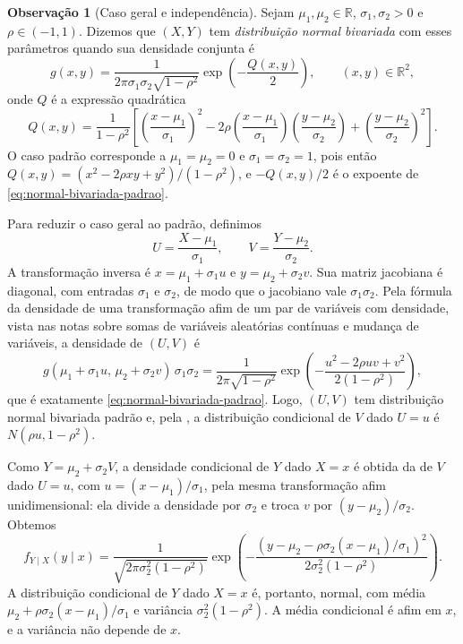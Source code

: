 \documentclass[12pt,portuguese]{article}
\theoremstyle{definition}
\newtheorem{remark}[remark]{Observação}
\theoremstyle{plainexercise}
\theoremstyle{starredexercise}
\theoremstyle{definition}
\begin{document}
\begin{remark}[Caso geral e independência]\label{rem:normal-independencia}
Sejam $\mu_1,\mu_2 \in \mathbb{R}$, $\sigma_1,\sigma_2 > 0$ e $\rho \in (-1,1)$. Dizemos que
$(X,Y)$ tem \emph{distribuição normal bivariada} com esses parâmetros quando sua densidade
conjunta é
\begin{equation}
  g(x,y) = \frac{1}{2\pi\sigma_1\sigma_2\sqrt{1-\rho^2}}
  \exp\!\left(-\frac{Q(x,y)}{2}\right),
  \qquad (x,y) \in \mathbb{R}^2,
  \label{eq:normal-bivariada-geral}
\end{equation}
onde $Q$ é a expressão quadrática
\begin{equation}
  Q(x,y) = \frac{1}{1-\rho^2}\left[
    \left(\frac{x-\mu_1}{\sigma_1}\right)^2
    - 2\rho\left(\frac{x-\mu_1}{\sigma_1}\right)
         \left(\frac{y-\mu_2}{\sigma_2}\right)
    + \left(\frac{y-\mu_2}{\sigma_2}\right)^2
  \right].
  \label{eq:forma-quadratica-normal}
\end{equation}
O caso padrão corresponde a $\mu_1 = \mu_2 = 0$ e $\sigma_1 = \sigma_2 = 1$, pois então
$Q(x,y) = (x^2 - 2\rho xy + y^2)/(1-\rho^2)$, e $-Q(x,y)/2$ é o expoente de
\eqref{eq:normal-bivariada-padrao}.

Para reduzir o caso geral ao padrão, definimos
\[
  U = \frac{X-\mu_1}{\sigma_1}, \qquad V = \frac{Y-\mu_2}{\sigma_2}.
\]
A transformação inversa é $x = \mu_1 + \sigma_1 u$ e $y = \mu_2 + \sigma_2 v$. Sua matriz
jacobiana é diagonal, com entradas $\sigma_1$ e $\sigma_2$, de modo que o jacobiano vale
$\sigma_1\sigma_2$. Pela fórmula da densidade de uma transformação afim de um par de
variáveis com densidade, vista nas notas sobre somas de variáveis aleatórias contínuas e
mudança de variáveis, a densidade de $(U,V)$ é
\[
  g(\mu_1 + \sigma_1 u,\, \mu_2 + \sigma_2 v)\,\sigma_1\sigma_2
  = \frac{1}{2\pi\sqrt{1-\rho^2}}
    \exp\!\left(-\frac{u^2 - 2\rho uv + v^2}{2(1-\rho^2)}\right),
\]
que é exatamente \eqref{eq:normal-bivariada-padrao}. Logo, $(U,V)$ tem distribuição normal
bivariada padrão e, pela , a distribuição condicional de $V$ dado
$U = u$ é $N(\rho u, 1-\rho^2)$.

Como $Y = \mu_2 + \sigma_2 V$, a densidade condicional de $Y$ dado $X = x$ é obtida da de
$V$ dado $U = u$, com $u = (x-\mu_1)/\sigma_1$, pela mesma transformação afim unidimensional:
ela divide a densidade por $\sigma_2$ e troca $v$ por $(y-\mu_2)/\sigma_2$. Obtemos
\begin{equation}
  f_{Y\mid X}(y \mid x)
  = \frac{1}{\sqrt{2\pi\sigma_2^2(1-\rho^2)}}
    \exp\!\left(
      -\frac{\left(y - \mu_2 - \rho\sigma_2(x-\mu_1)/\sigma_1\right)^2}
            {2\sigma_2^2(1-\rho^2)}
    \right).
  \label{eq:condicional-normal-geral}
\end{equation}
A distribuição condicional de $Y$ dado $X = x$ é, portanto, normal, com média
$\mu_2 + \rho\sigma_2(x-\mu_1)/\sigma_1$ e variância $\sigma_2^2(1-\rho^2)$. A média
condicional é afim em $x$, e a variância não depende de $x$.


\end{remark}
\end{document}
